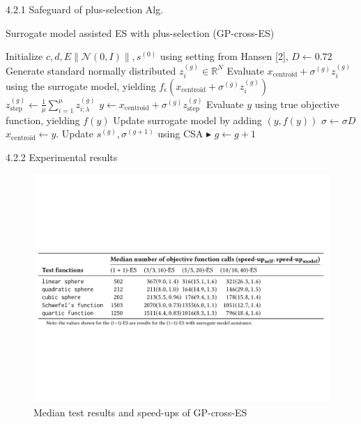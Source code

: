 \documentclass{beamer}
\begin{document}
\begin{frame}{4.2.1 Safeguard of plus-selection Alg.}
\begin{block}{Surrogate model assisted ES with plus-selection (GP-cross-ES)}
 \footnotesize{
    \begin{algorithm}[H]
    \begin{algorithmic}[1]
        \STATE Initialize $c,d,E \left\lVert \mathcal{N}(0,I) \right\rVert,s^{(0)}$  using setting from Hansen [2], $D \leftarrow 0.72$
    		\STATE Generate standard normally distributed $z_i^{(g)} \in \mathbb{R}^N $
    		\STATE Evaluate $x_{\text{centroid}}+ \sigma^{(g)} z_i^{(g)}$ using the surrogate model, yielding $f_{\epsilon}(x_{\text{centroid}} + \sigma^{(g)} z_i^{(g)})$
    	\ENDFOR
    	\STATE $z_{\text{step}}^{(g)} \leftarrow \frac{1}{\mu}\sum_{i=1}^{\mu} z_{i;\lambda}^{(g)}$
    	\STATE $y  \leftarrow  x_{\text{centroid}} + \sigma^{(g)} z_{\text{step}}^{(g)}$ 
    	\STATE Evaluate $y$ using true objective function, yielding $f(y)$
    	\STATE Update surrogate model by adding $(y,f(y))$
    		\STATE $\sigma \leftarrow \sigma D$
    	\ELSE
    		\STATE $ x_{\text{centroid}} \leftarrow y $. Update $s^{(g)},\sigma^{(g+1)}$ using CSA \hfill$\blacktriangleright$ %
    	\ENDIF
    	\STATE $g \leftarrow g + 1$
    \ENDWHILE
    \end{algorithmic}
    \end{algorithm}
}
\end{block}
\end{frame}

\begin{frame}{4.2.2 Experimental results}

\begin{figure}
\includegraphics[width=1.0\linewidth]{tab-GP-cross-ES.pdf}
    \caption{Median test results and speed-ups of GP-cross-ES}
\end{figure}


\end{frame}
\end{document}
